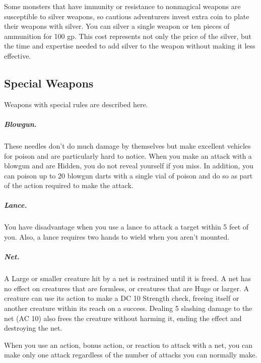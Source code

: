 Some monsters that have immunity or resistance to nonmagical weapons are susceptible to silver weapons, so cautious adventurers invest extra coin to plate their weapons with silver. You can silver a single weapon or ten pieces of ammunition for 100 gp. This cost represents not only the price of the silver, but the time and expertise needed to add silver to the weapon without making it less effective.

\subsection{Special Weapons}

Weapons with special rules are described here.

\subparagraph*{Blowgun.} These needles don't do much damage by themselves but make excellent vehicles for poison and are particularly hard to notice. When you make an attack with a blowgun and are Hidden, you do not reveal yourself if you miss. In addition, you can poison up to 20 blowgun darts with a single vial of poison and do so as part of the action required to make the attack.

\subparagraph*{Lance.} You have disadvantage when you use a lance to attack a target within 5 feet of you. Also, a lance requires two hands to wield when you aren't mounted.

\subparagraph*{Net.} A Large or smaller creature hit by a net is restrained until it is freed. A net has no effect on creatures that are formless, or creatures that are Huge or larger. A creature can use its action to make a DC 10 Strength check, freeing itself or another creature within its reach on a success. Dealing 5 slashing damage to the net (AC 10) also frees the creature without harming it, ending the effect and destroying the net.

When you use an action, bonus action, or reaction to attack with a net, you can make only one attack regardless of the number of attacks you can normally make.

